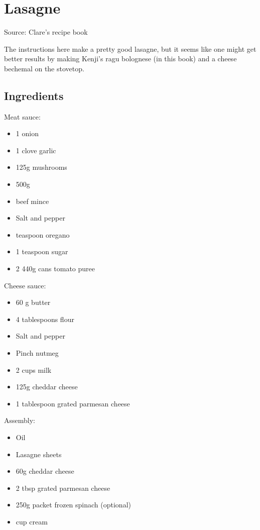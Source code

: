 \section{Lasagne}

  
Source: Clare's recipe book

The instructions here make a pretty good lasagne, but it seems like one might get better results by making Kenji's ragu bolognese (in this book) and a cheese bechemal on the stovetop.

\subsection{Ingredients}

Meat sauce:

\begin{itemize}
    \item 1 onion
    \item 1 clove garlic
    \item 125g mushrooms
    \item 500g
    \item beef mince
    \item Salt and pepper
    \item {} teaspoon oregano
    \item 1 teaspoon sugar
    \item 2 440g cans tomato puree
\end{itemize}

Cheese sauce:

\begin{itemize}
    \item 60 g butter
    \item 4 tablespoons flour
    \item Salt and pepper
    \item Pinch nutmeg
    \item 2 cups milk
    \item 125g cheddar cheese
    \item 1 tablespoon grated parmesan cheese
\end{itemize}

Assembly:

\begin{itemize}
    \item Oil
    \item Lasagne sheets
    \item 60g cheddar cheese
    \item 2 tbsp grated parmesan cheese
    \item 250g packet frozen spinach (optional)
    \item {} cup cream
\end{itemize}

